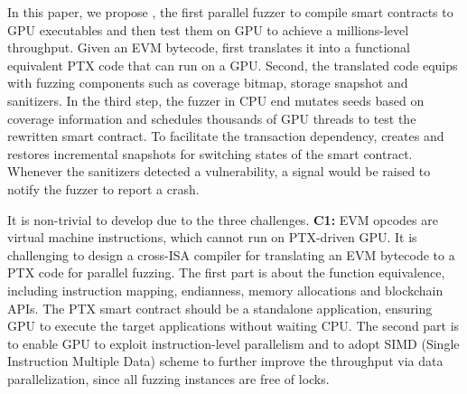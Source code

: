 In this paper, we propose {\tool}, the first parallel fuzzer to compile smart contracts to GPU executables and then test them on GPU to achieve a millions-level throughput.   
Given an EVM bytecode, {\tool} first translates it into a functional equivalent PTX code that can run on a GPU. 
Second, the translated code equips with fuzzing components such as coverage bitmap, storage snapshot and sanitizers. 
In the third step, the fuzzer in CPU end mutates seeds based on coverage information and schedules thousands of GPU threads to test the rewritten smart contract.
To facilitate the transaction dependency, {\tool} creates and restores incremental snapshots for switching states of the smart contract. 
Whenever the sanitizers detected a vulnerability, a signal would be raised to notify the fuzzer to report a crash.

It is non-trivial to develop {\tool} due to the three challenges. 
\textbf{C1:} 
EVM opcodes are virtual machine instructions, which cannot run on PTX-driven GPU. 
It is challenging to design a cross-ISA compiler for translating an EVM bytecode to a PTX code for parallel fuzzing. 
The first part is about the function equivalence, including instruction mapping, endianness, memory allocations and blockchain APIs. The PTX smart contract should be a standalone application, ensuring GPU to execute the target applications without waiting CPU. 
The second part is to enable GPU to exploit instruction-level parallelism and to adopt SIMD (Single Instruction Multiple Data) scheme to further improve the throughput via data parallelization\cite{falk2018vectorized}, since all fuzzing instances are free of locks. 



